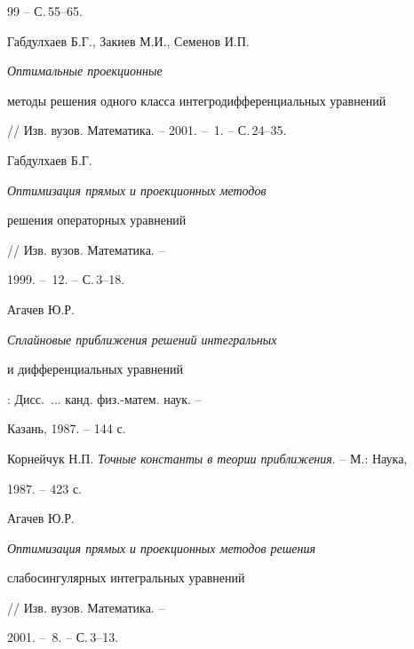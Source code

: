 \begin{thebibliography}{99}
-- С.\,55--65. 




Габдулхаев Б.Г., Закиев М.И., Семенов И.П. {\em Оптимальные проекционные 


методы решения одного класса интегродифференциальных уравнений} 


// Изв. вузов. Математика. -- 2001. -- \No\,1. -- С.\,24--35. 




Габдулхаев Б.Г. {\em Оптимизация прямых и проекционных методов 


решения операторных уравнений} // Изв. вузов. Математика. -- 


1999. -- \No\,12. -- С.\,3--18. 




Агачев Ю.Р. {\em Сплайновые приближения решений интегральных 


и дифференциальных уравнений}: Дисс.~$\dotsc$ канд. физ.-матем. наук. -- 


Казань, 1987. -- 144 с. 




Корнейчук Н.П. {\em Точные константы в теории приближения}. -- М.: Наука, 


1987. -- 423 с. 




Агачев Ю.Р. {\em Оптимизация прямых и проекционных методов решения 


слабосингулярных интегральных уравнений} // Изв. вузов. Математика. -- 


2001. -- \No\,8. -- С.\,3--13. 


 


\end{thebibliography} 


 


\vskip 2cm 


 






 


\label{end} 


 


 


